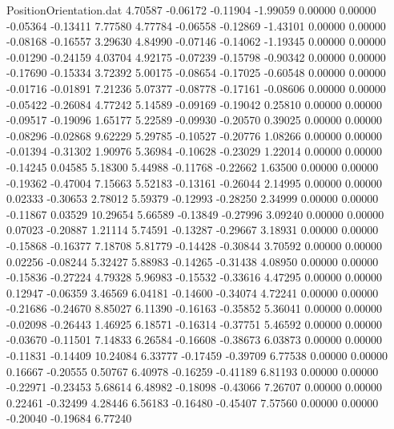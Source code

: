 \begin{filecontents}{PositionOrientation.dat}
   4.70587   -0.06172   -0.11904    -1.99059    0.00000    0.00000   -0.05364   -0.13411    7.77580
   4.77784   -0.06558   -0.12869    -1.43101    0.00000    0.00000   -0.08168   -0.16557    3.29630
   4.84990   -0.07146   -0.14062    -1.19345    0.00000    0.00000   -0.01290   -0.24159    4.03704
   4.92175   -0.07239   -0.15798    -0.90342    0.00000    0.00000   -0.17690   -0.15334    3.72392
   5.00175   -0.08654   -0.17025    -0.60548    0.00000    0.00000   -0.01716   -0.01891    7.21236
   5.07377   -0.08778   -0.17161    -0.08606    0.00000    0.00000   -0.05422   -0.26084    4.77242
   5.14589   -0.09169   -0.19042     0.25810    0.00000    0.00000   -0.09517   -0.19096    1.65177
   5.22589   -0.09930   -0.20570     0.39025    0.00000    0.00000   -0.08296   -0.02868    9.62229
   5.29785   -0.10527   -0.20776     1.08266    0.00000    0.00000   -0.01394   -0.31302    1.90976
   5.36984   -0.10628   -0.23029     1.22014    0.00000    0.00000   -0.14245    0.04585    5.18300
   5.44988   -0.11768   -0.22662     1.63500    0.00000    0.00000   -0.19362   -0.47004    7.15663
   5.52183   -0.13161   -0.26044     2.14995    0.00000    0.00000    0.02333   -0.30653    2.78012
   5.59379   -0.12993   -0.28250     2.34999    0.00000    0.00000   -0.11867    0.03529   10.29654
   5.66589   -0.13849   -0.27996     3.09240    0.00000    0.00000    0.07023   -0.20887    1.21114
   5.74591   -0.13287   -0.29667     3.18931    0.00000    0.00000   -0.15868   -0.16377    7.18708
   5.81779   -0.14428   -0.30844     3.70592    0.00000    0.00000    0.02256   -0.08244    5.32427
   5.88983   -0.14265   -0.31438     4.08950    0.00000    0.00000   -0.15836   -0.27224    4.79328
   5.96983   -0.15532   -0.33616     4.47295    0.00000    0.00000    0.12947   -0.06359    3.46569
   6.04181   -0.14600   -0.34074     4.72241    0.00000    0.00000   -0.21686   -0.24670    8.85027
   6.11390   -0.16163   -0.35852     5.36041    0.00000    0.00000   -0.02098   -0.26443    1.46925
   6.18571   -0.16314   -0.37751     5.46592    0.00000    0.00000   -0.03670   -0.11501    7.14833
   6.26584   -0.16608   -0.38673     6.03873    0.00000    0.00000   -0.11831   -0.14409   10.24084
   6.33777   -0.17459   -0.39709     6.77538    0.00000    0.00000    0.16667   -0.20555    0.50767
   6.40978   -0.16259   -0.41189     6.81193    0.00000    0.00000   -0.22971   -0.23453    5.68614
   6.48982   -0.18098   -0.43066     7.26707    0.00000    0.00000    0.22461   -0.32499    4.28446
   6.56183   -0.16480   -0.45407     7.57560    0.00000    0.00000   -0.20040   -0.19684    6.77240

\end{filecontents}
